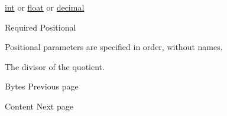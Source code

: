\href{/docs/reference/foundations/int/}{int} {or}
\href{/docs/reference/foundations/float/}{float} {or}
\href{/docs/reference/foundations/decimal/}{decimal}

{Required} {{ Positional }}

\label{functions-quo-divisor-positional-tooltip}
Positional parameters are specified in order, without names.

The divisor of the quotient.

\href{/docs/reference/foundations/bytes/}{\pandocbounded{}}

{ Bytes } { Previous page }

\href{/docs/reference/foundations/content/}{\pandocbounded{}}

{ Content } { Next page }
